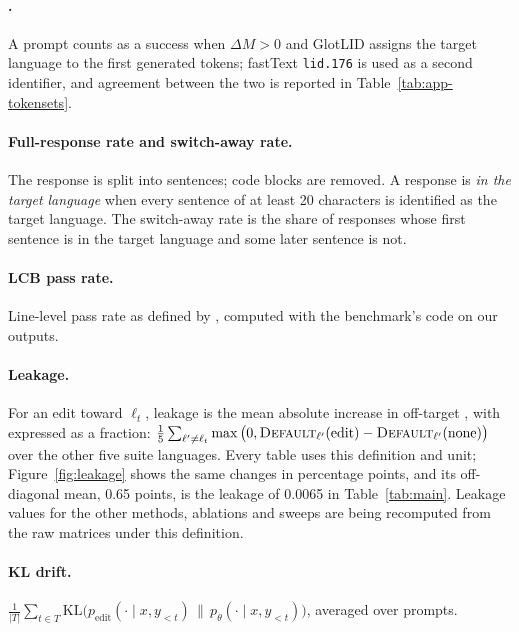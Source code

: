 \paragraph{.}
A prompt counts as a success when $\Delta M>0$ and GlotLID \citep{kargaran2023glotlid} assigns the target language to the first  generated tokens; fastText \texttt{lid.176} \citep{joulin2017bag} is used as a second identifier, and agreement between the two is reported in Table~\ref{tab:app-tokensets}.

\paragraph{Full-response rate and switch-away rate.}
The response is split into sentences; code blocks are removed. A response is \emph{in the target language} when every sentence of at least 20 characters is identified as the target language. The switch-away rate is the share of responses whose first sentence is in the target language and some later sentence is not.

\paragraph{LCB pass rate.}
Line-level pass rate as defined by \citet{marchisio-etal-2024-understanding}, computed with the benchmark's code on our outputs.

\paragraph{Leakage.}
For an edit toward $\ell_t$, leakage is the mean absolute increase in off-target , with  expressed as a fraction: $\frac{1}{5}\sum_{\ell'\ne\ell_t}\max\big(0,\textsc{Default}_{\ell'}(\text{edit})-\textsc{Default}_{\ell'}(\text{none})\big)$ over the other five suite languages. Every table uses this definition and unit; Figure~\ref{fig:leakage} shows the same changes in percentage points, and its off-diagonal mean, 0.65 points, is the \foxp leakage of 0.0065 in Table~\ref{tab:main}. Leakage values for the other methods, ablations and sweeps are being recomputed from the raw matrices under this definition.

\paragraph{KL drift.}
$\frac{1}{|T|}\sum_{t\in T}\mathrm{KL}\big(p_{\mathrm{edit}}(\cdot\mid x,y_{<t})\,\|\,p_\theta(\cdot\mid x,y_{<t})\big)$, averaged over \nocue prompts.

